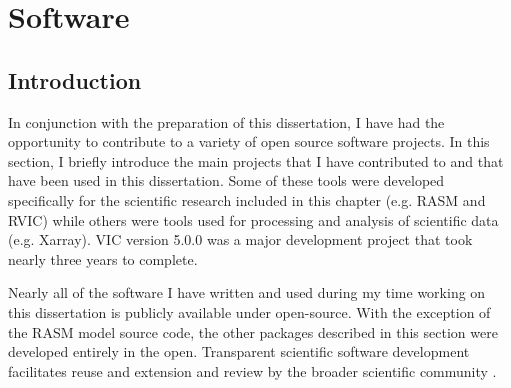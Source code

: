 \chapter{Software}
\label{chap:software}

\section{Introduction}
In conjunction with the preparation of this dissertation, I have had the opportunity to contribute to a variety of open source software projects.
In this section, I briefly introduce the main projects that I have contributed to and that have been used in this dissertation.
Some of these tools were developed specifically for the scientific research included in this chapter (e.g. RASM and RVIC) while others were tools used for processing and analysis of scientific data (e.g. Xarray).
VIC version 5.0.0 was a major development project that took nearly three years to complete.

Nearly all of the software I have written and used during my time working on this dissertation is publicly available under open-source.
With the exception of the RASM model source code, the other packages described in this section were developed entirely in the open.
Transparent scientific software development facilitates reuse and extension and review by the broader scientific community \citep{Ince_2012}.

